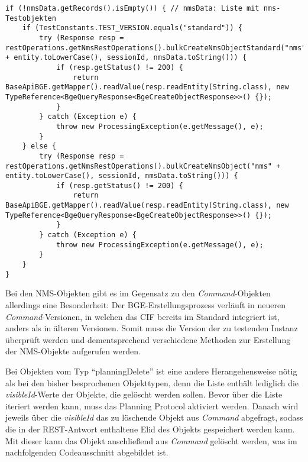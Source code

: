 \begin{lstlisting}[caption=Erstellen von \textit{NMS}-Objekten über die BGE, label=createNMSTestObjects,style=Javastyle]
if (!nmsData.getRecords().isEmpty()) { // nmsData: Liste mit nms-Testobjekten
    if (TestConstants.TEST_VERSION.equals("standard")) {
        try (Response resp = restOperations.getNmsRestOperations().bulkCreateNmsObjectStandard("nms" + entity.toLowerCase(), sessionId, nmsData.toString())) {
            if (resp.getStatus() != 200) {
                return BaseApiBGE.getMapper().readValue(resp.readEntity(String.class), new TypeReference<BgeQueryResponse<BgeCreateObjectResponse>>() {});
            }
        } catch (Exception e) {
            throw new ProcessingException(e.getMessage(), e);
        }
    } else {
        try (Response resp = restOperations.getNmsRestOperations().bulkCreateNmsObject("nms" + entity.toLowerCase(), sessionId, nmsData.toString())) {
            if (resp.getStatus() != 200) {
                return BaseApiBGE.getMapper().readValue(resp.readEntity(String.class), new TypeReference<BgeQueryResponse<BgeCreateObjectResponse>>() {});
            }
        } catch (Exception e) {
            throw new ProcessingException(e.getMessage(), e);
        }
    }
}
\end{lstlisting}

Bei den \ac{NMS}-Objekten gibt es im Gegensatz zu den \textit{Command}-Objekten allerdings eine Besonderheit: Der \ac{BGE}-Erstellungsprozess verläuft in neueren \textit{Command}-Versionen, in welchen das \ac{CIF} bereits im Standard integriert ist, anders als in älteren Versionen. Somit muss die Version der zu testenden Instanz überprüft werden und dementsprechend verschiedene Methoden zur Erstellung der \ac{NMS}-Objekte aufgerufen werden.

Bei Objekten vom Typ \enquote{planningDelete} ist eine andere Herangehensweise nötig als bei den bisher besprochenen Objekttypen, denn die Liste enthält lediglich die \textit{visibleId}-Werte der Objekte, die gelöscht werden sollen. Bevor über die Liste iteriert werden kann, muss das Planning Protocol aktiviert werden. Danach wird jeweils über die \textit{visibleId} das zu löschende Objekt aus \textit{Command} abgefragt, sodass die in der \ac{REST}-Antwort enthaltene \ac{Elid} des Objekts gespeichert werden kann. Mit dieser kann das Objekt anschließend aus \textit{Command} gelöscht werden, was im nachfolgenden Codeausschnitt abgebildet ist.

